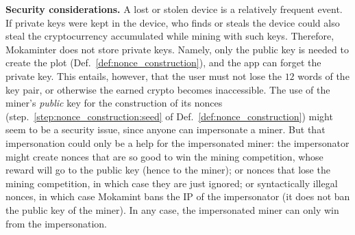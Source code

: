 


\vspace{0.5ex}\noindent\textbf{Security considerations.}
%
A lost or stolen device is a relatively frequent event.
If private keys were kept in the device, who finds
or steals the device could also steal the cryptocurrency accumulated while mining with such keys.
Therefore, Mokaminter does not store private keys.
Namely, only the public key is needed to create the plot (Def.~\ref{def:nonce_construction}), and
the app can forget the private key. This entails, however,
that the user must not lose the $12$ words of the key pair,
or otherwise the earned crypto becomes inaccessible.
The use of the miner's \emph{public} key for the construction of its nonces
(step.~\ref{step:nonce_construction:seed}
of Def.~\ref{def:nonce_construction}) might seem
to be a security issue, since anyone can impersonate a miner.
But that impersonation could only be a help for the impersonated miner:
the impersonator might create nonces that are so good to win
the mining competition, whose reward will go to the public key (hence to the miner);
or nonces that lose the mining competition, in which case they are just ignored;
or syntactically illegal nonces, in which case Mokamint bans the IP of the impersonator
(it does not ban the public key of the miner). In any case, the impersonated miner
can only win from the impersonation.

